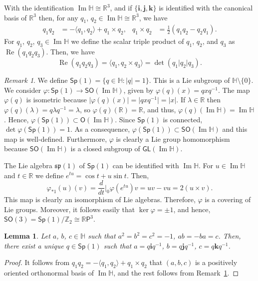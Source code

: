 \documentclass[12pt, a4paper,draft]{amsart}
\newcommand{\g}{\mathfrak}
\newcommand{\R}{\mathbb{R}}
\renewcommand{\H}{\mathbb{H}}
\renewcommand{\Re}{\operatorname{Re}}
\renewcommand{\Im}{\operatorname{Im}}
\newcommand{\Sp}{\mathsf{Sp}}
\newtheorem{lemma}[theorem]{Lemma}
\theoremstyle{remark}
\newtheorem{remark}{Remark}
\begin{document}
With the identification $\Im\H\cong\R^3$, and if $\{\mathbf{i},\mathbf{j},\mathbf{k}\}$ is identified with the canonical basis of $\R^3$ then, for any $q_1$, $q_2\in\Im{\H}\cong\R^3$, we have 
\[
\begin{aligned}
q_1 q_2
&{}=-\langle q_1,q_2\rangle+q_1\times q_2,
&q_1\times q_2
&{}=\frac{1}{2}(q_1q_2-q_2q_1).
\end{aligned}
\]
For $q_1$, $q_2$, $q_3\in\Im\H$ we define the scalar triple product of $q_1$, $q_2$, and $q_3$ as $\Re(q_1q_2q_3)$.
Then, we have
\[
\Re(q_1q_2q_3)=\langle q_1,q_2\times q_3\rangle=\det(q_1\vert q_2\vert q_3).
\]

\begin{remark}\label{remark:Sp1}
We define $\Sp(1)=\{q\in\H:\lvert q\rvert =1\}$.
This is a Lie subgroup of $\H\setminus\{0\}$.
We consider $\varphi\colon\Sp(1)\to\mathsf{SO}(\Im\H)$, given by $\varphi(q)(x)=qxq^{-1}$. 
The map $\varphi(q)$ is isometric because $\lvert\varphi(q)(x)\rvert=\lvert qxq^{-1}\rvert=\lvert x\rvert$. 
If $\lambda\in\R$ then $\varphi(q)(\lambda)=q\lambda q^{-1}=\lambda$, so $\varphi(q)(\R)=\R$, and thus, $\varphi(q)(\Im\H)=\Im\H$. 
Hence, $\varphi(\Sp(1))\subset\mathsf{O}(\Im\H)$.
Since $\Sp(1)$ is connected, $\det\varphi(\Sp(1))=1$. 
As a consequence, $\varphi(\Sp(1))\subset\mathsf{SO}(\Im\H)$ and this map is well-defined.
Furthermore, $\varphi$ is clearly a Lie group homomorphism because $\mathsf{SO}(\Im\H)$ is a closed subgroup of $\mathsf{GL}(\Im\H)$. 

The Lie algebra $\g{sp}(1)$ of $\Sp(1)$ can be identified with $\Im\H$.
For $u\in\Im\H$ and $t\in\R$ we define $e^{tu}=\cos t+u\sin t$.
Then, 
\[
\varphi_{*1}(u)(v)=\frac{d}{dt}\bigg\vert_0\varphi(e^{tu})v=uv-vu=2(u\times v).
\]
This map is clearly an isomorphism of Lie algebras. 
Therefore, $\varphi$ is a covering of Lie groups.
Moreover, it follows easily that $\ker\varphi={\pm 1}$, and hence, $\mathsf{SO}(3)=\Sp(1)/\mathbb{Z}_2\cong\R\mathsf{P}^3$.
\end{remark}

\begin{lemma}\label{lemma:canonical-triple}
Let $a$, $b$, $c\in\H$ such that $a^2=b^2=c^2=-1$, $ab=-ba=c$.
Then, there exist a unique $q\in\Sp(1)$ such that $a=q\mathbf{i}q^{-1}$, $b=q\mathbf{j}q^{-1}$, $c=q\mathbf{k}q^{-1}$.
\end{lemma}

\begin{proof}
It follows from $q_1 q_2=-\langle q_1,q_2\rangle+q_1\times q_2$ that $(a,b,c)$ is a positively oriented orthonormal basis of $\Im\H$, and the rest follows from Remark~\ref{remark:Sp1}.
\end{proof}
\end{document}
